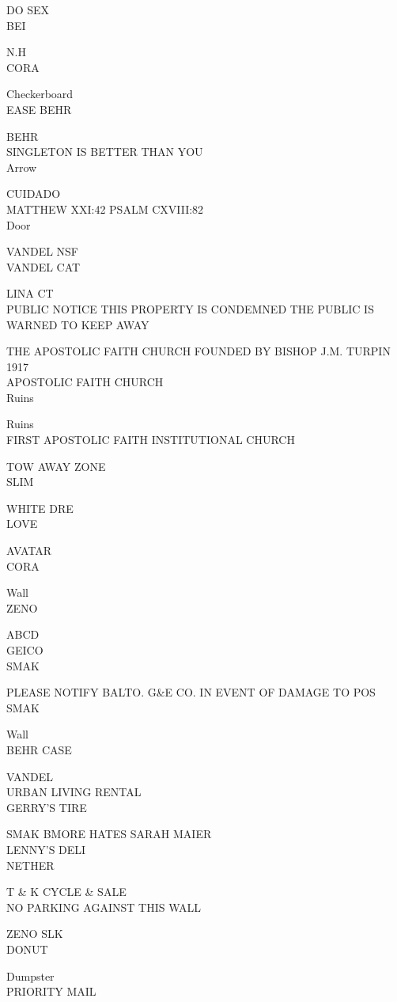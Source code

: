 \documentclass[10pt,letterpaper]{article}
\begin{document}
DO SEX\\
BEI

N.H\\
CORA

Checkerboard\\
EASE BEHR

BEHR\\
SINGLETON IS BETTER THAN YOU\\
Arrow

CUIDADO\\
MATTHEW XXI:42 PSALM CXVIII:82\\
Door

VANDEL NSF\\
VANDEL CAT

LINA CT\\
PUBLIC NOTICE THIS PROPERTY IS CONDEMNED THE PUBLIC IS WARNED TO KEEP AWAY

THE APOSTOLIC FAITH CHURCH FOUNDED BY BISHOP J.M. TURPIN 1917\\
APOSTOLIC FAITH CHURCH\\
Ruins

Ruins\\
FIRST APOSTOLIC FAITH INSTITUTIONAL CHURCH

TOW AWAY ZONE\\
SLIM

WHITE DRE\\
LOVE

AVATAR\\
CORA

Wall\\
ZENO

ABCD\\
GEICO\\
SMAK

PLEASE NOTIFY BALTO. G\&E CO. IN EVENT OF DAMAGE TO POS\\
SMAK

Wall\\
BEHR CASE

VANDEL\\
URBAN LIVING RENTAL\\
GERRY'S TIRE

SMAK BMORE HATES SARAH MAIER\\
LENNY'S DELI\\
NETHER

T \& K CYCLE \& SALE\\
NO PARKING AGAINST THIS WALL

ZENO SLK\\
DONUT

Dumpster\\
PRIORITY MAIL
\end{document}
